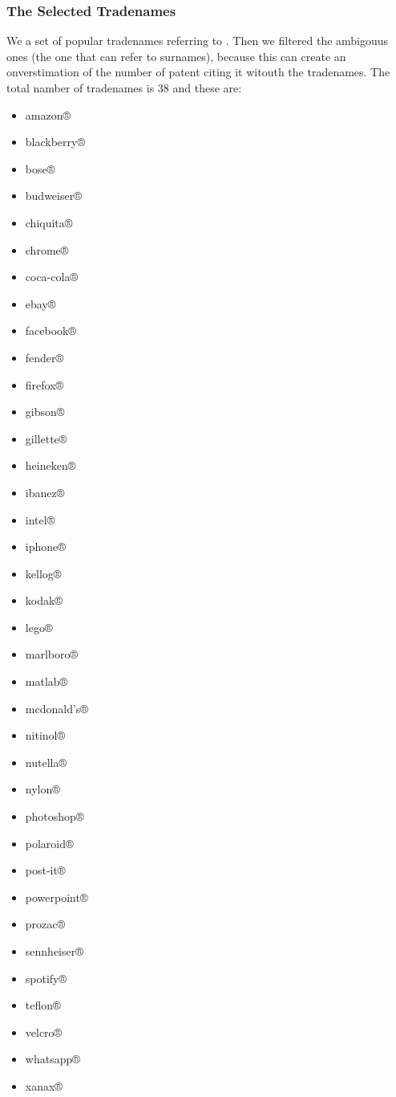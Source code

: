 \documentclass[]{book}
\providecommand{\tightlist}{%
  \setlength{\itemsep}{0pt}\setlength{\parskip}{0pt}}
\begin{document}
\subsubsection{The Selected Tradenames}\label{the-selected-tradenames}

We a set of popular tradenames referring to
\citep{morris2016trademarks}. Then we filtered the ambigouus ones (the
one that can refer to surnames), because this can create an
onverstimation of the number of patent citing it witouth the tradenames.
The total namber of tradenames is 38 and these are:

\begin{itemize}
\tightlist
\item
  amazon®
\item
  blackberry®
\item
  bose®
\item
  budweiser®
\item
  chiquita®
\item
  chrome®
\item
  coca-cola®
\item
  ebay®
\item
  facebook®
\item
  fender®
\item
  firefox®
\item
  gibson®
\item
  gillette®
\item
  heineken®
\item
  ibanez®
\item
  intel®
\item
  iphone®
\item
  kellog®
\item
  kodak®
\item
  lego®
\item
  marlboro®
\item
  matlab®
\item
  mcdonald's®
\item
  nitinol®
\item
  nutella®
\item
  nylon®
\item
  photoshop®
\item
  polaroid®
\item
  post-it®
\item
  powerpoint®
\item
  prozac®
\item
  sennheiser®
\item
  spotify®
\item
  teflon®
\item
  velcro®
\item
  whatsapp®
\item
  xanax®
\end{itemize}
\end{document}

